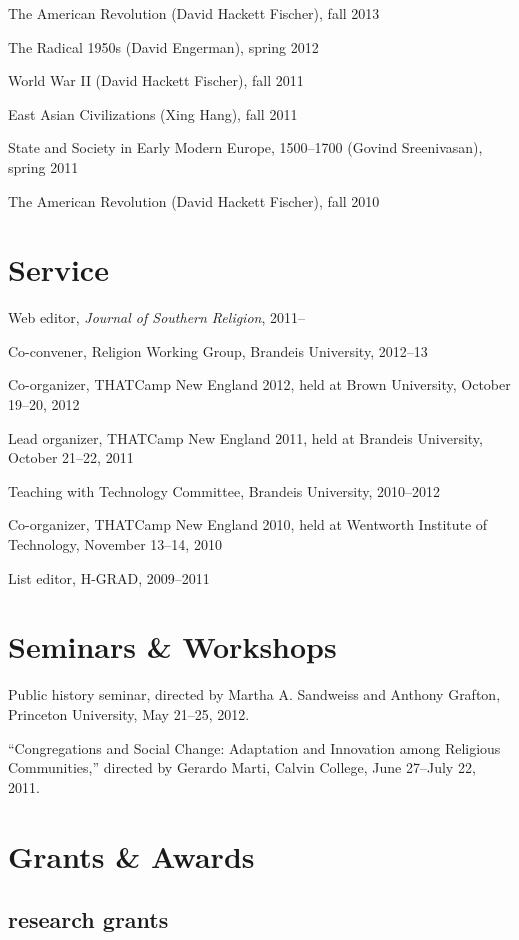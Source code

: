 \documentclass[11pt]{article}
\begin{document}
The American Revolution (David Hackett Fischer), fall 2013

The Radical 1950s (David Engerman), spring 2012

World War II (David Hackett Fischer), fall 2011

East Asian Civilizations (Xing Hang), fall 2011

State and Society in Early Modern Europe, 1500--1700
(Govind Sreenivasan), spring 2011

The American Revolution (David Hackett Fischer), fall 2010

\section{Service}

Web editor, \emph{Journal of Southern Religion}, 2011--

Co-convener, Religion Working Group, Brandeis University, 
2012--13

Co-organizer, THATCamp New England 2012, held at Brown University,
October 19--20, 2012

Lead organizer, THATCamp New England 2011, held at Brandeis University, 
October 21--22, 2011

Teaching with Technology Committee, Brandeis University, 2010--2012

Co-organizer, THATCamp New England 2010, held at Wentworth Institute of 
Technology, November 13--14, 2010

List editor, H-GRAD, 2009--2011

\section{Seminars \& Workshops}

Public history seminar, directed by Martha A. Sandweiss and 
Anthony Grafton, Princeton University, May 21--25, 2012.

``Congregations and Social Change: Adaptation and Innovation among 
Religious Communities,'' directed by Gerardo Marti, Calvin College, June 
27--July 22, 2011.

\section{Grants \& Awards}

\subsection{research grants}
\end{document}
